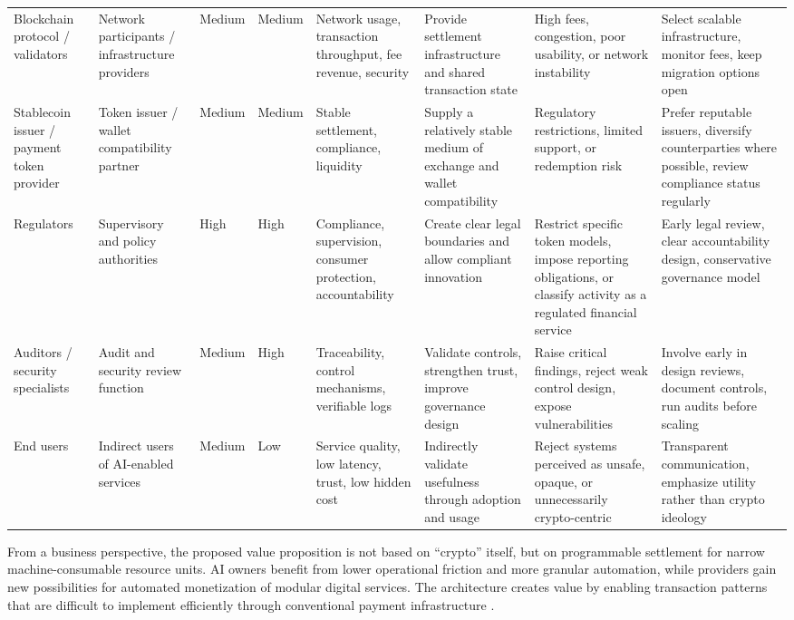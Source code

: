 \documentclass[12pt,a4paper,oneside]{article}
\theoremstyle{definition}
\theoremstyle{plain}
\begin{document}
\begin{landscape}
\begin{longtable}{p{3.0cm}p{3.2cm}p{1.2cm}p{1.3cm}p{3.6cm}p{3.6cm}p{3.6cm}p{3.8cm}}
Blockchain protocol / validators &
Network participants / infrastructure providers &
Medium &
Medium &
Network usage, transaction throughput, fee revenue, security &
Provide settlement infrastructure and shared transaction state &
High fees, congestion, poor usability, or network instability &
Select scalable infrastructure, monitor fees, keep migration options open \\

Stablecoin issuer / payment token provider &
Token issuer / wallet compatibility partner &
Medium &
Medium &
Stable settlement, compliance, liquidity &
Supply a relatively stable medium of exchange and wallet compatibility &
Regulatory restrictions, limited support, or redemption risk &
Prefer reputable issuers, diversify counterparties where possible, review compliance status regularly \\

Regulators &
Supervisory and policy authorities &
High &
High &
Compliance, supervision, consumer protection, accountability &
Create clear legal boundaries and allow compliant innovation &
Restrict specific token models, impose reporting obligations, or classify activity as a regulated financial service &
Early legal review, clear accountability design, conservative governance model \\

Auditors / security specialists &
Audit and security review function &
Medium &
High &
Traceability, control mechanisms, verifiable logs &
Validate controls, strengthen trust, improve governance design &
Raise critical findings, reject weak control design, expose vulnerabilities &
Involve early in design reviews, document controls, run audits before scaling \\

End users &
Indirect users of AI-enabled services &
Medium &
Low &
Service quality, low latency, trust, low hidden cost &
Indirectly validate usefulness through adoption and usage &
Reject systems perceived as unsafe, opaque, or unnecessarily crypto-centric &
Transparent communication, emphasize utility rather than crypto ideology \\

\bottomrule
\end{longtable}
\normalsize

\end{landscape}

From a business perspective, the proposed value proposition is not based on ``crypto'' itself, but on programmable settlement for narrow machine-consumable resource units. AI owners benefit from lower operational friction and more granular automation, while providers gain new possibilities for automated monetization of modular digital services. The architecture creates value by enabling transaction patterns that are difficult to implement efficiently through conventional payment infrastructure \citep{krueger2026workshop4,mougayar2016}.
\end{document}
